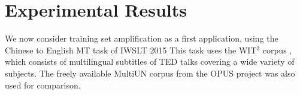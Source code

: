 








\section{Experimental Results}
\label{supersec:experimental_results}

\label{sec:experiments}
We now consider training set amplification as a first application, using the Chinese to English MT task of IWSLT 2015 
This task uses the WIT$^3$ corpus , which consists of multilingual subtitles of TED talks covering a wide variety of subjects. 
The freely available MultiUN corpus  from the OPUS project  was also used for comparison.

